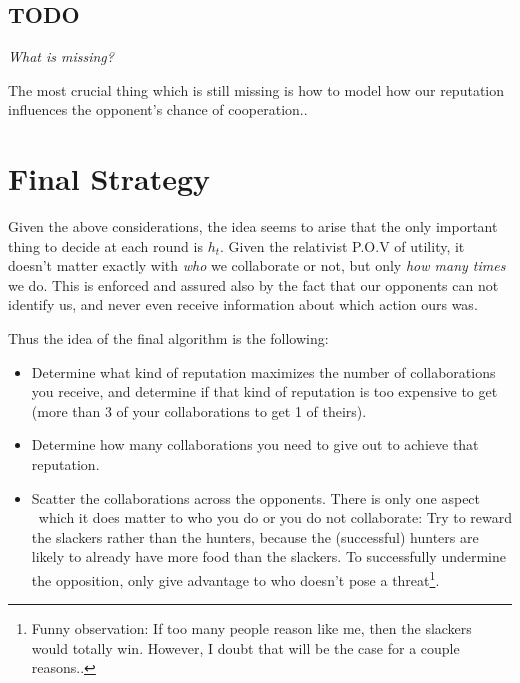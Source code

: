 \documentclass[10pt,fleqn]{article}
\begin{document}
\subsection{TODO}
\emph{What is missing?}

The most crucial thing which is still missing is how to model how our reputation
influences the opponent's chance of cooperation..

\section{Final Strategy}

Given the above considerations, the idea seems to arise that the only important
thing to decide at each round is $h_t$. Given the relativist P.O.V of utility, it
doesn't matter exactly with \emph{who} we collaborate or not, but only \emph{how
many times} we do. This is enforced and assured also by the fact that our
opponents can not identify us, and never even receive information about which
action ours was.

Thus the idea of the final algorithm is the following:
\begin{itemize}
  \item Determine what kind of reputation maximizes the number of collaborations
  you receive, and determine if that kind of reputation is too expensive to get
  (more than 3 of your collaborations to get 1 of theirs).
  \item Determine how many collaborations you need to give out to achieve that
  reputation.
  \item Scatter the collaborations across the opponents. There is only one
  aspect \wrt\ which it does matter to who you do or you do not collaborate: Try
  to reward the slackers rather than the hunters, because the (successful)
  hunters are likely to already have more food than the slackers. To
  successfully undermine the opposition, only give advantage to who doesn't pose
  a threat\footnote{Funny observation: If too many people reason like me,
  then the slackers would totally win. However, I doubt that will be the
  case for a couple reasons..}.
\end{itemize}
\end{document}
